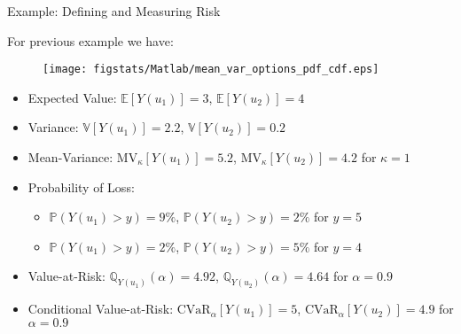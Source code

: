 \documentclass[9pt]{beamer}
\begin{document}
%
\begin{frame}{Example: Defining and Measuring Risk}

For previous example we have:
\begin{figure}[!htb]
    \centering
	\texttt{[image: figstats/Matlab/mean\_var\_options\_pdf\_cdf.eps]}
\end{figure}

\begin{itemize}
\item Expected Value: $\mathbb{E}[Y(u_1)]=3$, $\mathbb{E}[Y(u_2)]=4$
\item Variance: $\mathbb{V}[Y(u_1)]=2.2$, $\mathbb{V}[Y(u_2)]=0.2$
\item Mean-Variance: $\textrm{MV}_\kappa[Y(u_1)]=5.2$, $\textrm{MV}_\kappa[Y(u_2)]=4.2$ for $\kappa=1$
\item Probability of Loss: 
\begin{itemize}
\item $\mathbb{P}(Y(u_1)>y)=9\%$, $\mathbb{P}(Y(u_2)> y)=2\%$  for $y=5$
\item $\mathbb{P}(Y(u_1)>y)=2\%$, $\mathbb{P}(Y(u_2)> y)=5\%$  for $y=4$
\end{itemize}
\item Value-at-Risk: $\mathbb{Q}_{Y(u_1)}(\alpha)=4.92$, $\mathbb{Q}_{Y(u_2)}(\alpha)=4.64$ for $\alpha=0.9$
\item Conditional Value-at-Risk: $\textrm{CVaR}_\alpha[Y(u_1)]=5$, $\textrm{CVaR}_\alpha[Y(u_2)]=4.9$  for $\alpha=0.9$
\end{itemize}

\end{frame}
\end{document}
